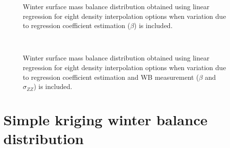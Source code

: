 \documentclass{sfuthesis}
\begin{document}
{\begin{appendices}
\begin{figure}
	\caption[]{Winter surface mass balance distribution obtained using linear regression for eight density interpolation options when variation due to regression coefficient estimation ($\beta$) is included. }
	\label{fig:WSMB_LR_Distributionbeta}
\end{figure}
\begin{figure}
	\centering
	\\
	\caption[]{Winter surface mass balance distribution obtained using linear regression for eight density interpolation options when variation due to regression coefficient estimation and WB measurement ($\beta$ and $\sigma_{ZZ}$) is included. }
	\label{fig:WSMB_LR_DistributionbetaNzz}
\end{figure}

\pagebreak
\section{Simple kriging winter balance distribution}


\end{appendices}}
\end{document}
